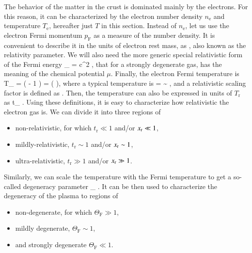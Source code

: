The behavior of the matter in the crust is dominated mainly by the electrons. 
For this reason, it can be characterized by the electron number density $n_{\mathrm{e}}$ and temperature $T_{\mathrm{e}}$, hereafter just $T$ in this section.
Instead of $n_{\mathrm{e}}$, let us use the electron Fermi momentum $p_{\mathrm{F}}$  as a measure of the number density.
It is convenient to describe it in the units of electron rest mass, as
\be
\xr \equiv {},
\ee
also known as the relativity parameter.\cite{Salpeter61}
We will also need the more generic special relativistic form of the Fermi energy
\be
\epsilon_{} = c^2 ,
\ee
that for a strongly degenerate gas, has the meaning of the chemical potential $\mu$.
Finally, the electron Fermi temperature is
\be
T_{} =  \left(  - 1 \right)
= \Tr (  ),
\ee
where a typical temperature is
\be
\Tr =  \sim {} \Kelvin,
\ee
and a relativistic scaling factor is defined as
\be
\gammar \equiv {}.
\ee
Then, the temperature can also be expressed in units of $T_{\mathrm{r}}$ as 
\be
t_{} \equiv {}.
\ee
Using these definitions, it is easy to characterize how relativistic the electron gas is.
We can divide it into three regions of 
\begin{itemize}
    \item non-relativistic, for which $t_{\mathrm{r}} \ll 1 $ and/or $x_{\mathrm{r}} \ll 1$, 
    \item mildly-relativistic, $t_{\mathrm{r}} \sim 1$ and/or $x_{\mathrm{r}} \sim 1$,
    \item ultra-relativistic, $t_{\mathrm{r}} \gg 1$ and/or $x_{\mathrm{r}} \gg 1$.
\end{itemize}

Similarly, we can scale the temperature with the Fermi temperature to get a so-called degeneracy parameter
\be\label{eq:Thetar}
\Theta_{} \equiv {}.
\ee
It can be then used to characterize the degeneracy of the plasma to regions of 
\begin{itemize}
    \item non-degenerate, for which $\Theta_{\mathrm{F}} \gg 1$,
    \item mildly degenerate, $\Theta_{\mathrm{F}} \sim 1$,
    \item and strongly degenerate $\Theta_{\mathrm{F}} \ll 1$.
\end{itemize}


